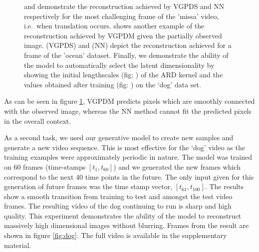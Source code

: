 \documentclass{article} %
\begin{document}
\begin{figure}[ht]
\begin{center}
{	\label{fig:scalesDogInit}
}
\end{center}
\caption{\small{
 and  demonstrate the reconstruction achieved by VGPDS and NN respectively for the most challenging frame  of the 'missa' video, i.e.\ when translation occurs.  shows another example of the reconstruction achieved by VGPDM given the partially observed image.  (VGPDS) and  (NN) depict the reconstruction achieved for a frame of the 'ocean' dataset. 
Finally, we demonstrate the ability of the model to automatically select the latent dimensionality by showing the initial lengthscales (fig: ) of the ARD kernel and the values obtained after training (fig: ) on the `dog' data set.
}
}
\label{fig:video1}
\end{figure}
As can be seen in figure \ref{fig:video1}, VGPDM predicts pixels which are smoothly connected with the observed image, whereas the NN method cannot fit the predicted pixels in the overall context.


\par As a second task, we used our generative model to create new
samples and generate a new video sequence. This is most effective for
the `dog' video as the training examples were approximately periodic
in nature. The model was trained on 60 frames (time-stamps $[t_1,
t_{60}]$) and we generated the new frames which correspond to the next
40 time points in the future. The only input given for this generation
of future frames was the time stamp vector, $[t_{61}, t_{100}]$. The
results show a smooth transition from training to test and amongst the
test video frames. The resulting video of the dog continuing to run is
sharp and high quality. This experiment demonstrates the ability of
the model to reconstruct massively high dimensional images without
blurring. Frames from the result are shown in figure
\ref{fig:dog}. The full video is available in the supplementary
material.
\end{document}
